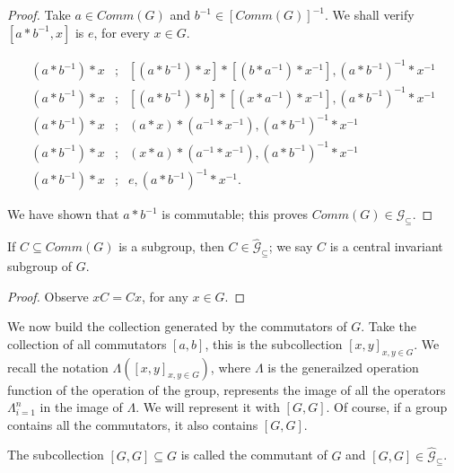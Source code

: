 \documentclass [12pt]{book}
\begin{document}
\begin{proof}Take $a\in Comm(G)$ and $b^{-1}\in[Comm(G)]^{-1}$. We shall verify $[a*b^{-1},x]$ is $e$, for every $x\in G$.

\begin{eqnarray}\nonumber (a*b^{-1})*x&;&[(a*b^{-1})*x]*[(b*a^{-1})*x^{-1}],(a*b^{-1})^{-1}*x^{-1}\\\nonumber (a*b^{-1})*x&;&[(a*b^{-1})*b]*[(x*a^{-1})*x^{-1}],(a*b^{-1})^{-1}*x^{-1}\\\nonumber (a*b^{-1})*x&;&(a*x)*(a^{-1}*x^{-1}),(a*b^{-1})^{-1}*x^{-1}\\\nonumber (a*b^{-1})*x&;&(x*a)*(a^{-1}*x^{-1}),(a*b^{-1})^{-1}*x^{-1}\\\nonumber (a*b^{-1})*x&;&e,(a*b^{-1})^{-1}*x^{-1}.\end{eqnarray}

 We have shown that $a*b^{-1}$ is commutable; this proves $Comm(G)\in\mathcal{G}_{\subseteq}$.\end{proof}

\begin{proposition}If $C\subseteq Comm(G)$ is a subgroup, then $C\in\hat{\mathcal{G}}_{\subseteq}$; we say $C$ is a central invariant subgroup of $G$.\end{proposition}

\begin{proof}Observe $xC=Cx$, for any $x\in G$.\end{proof}

We now build the collection generated by the commutators of $G$. Take the collection of all commutators $[a,b]$, this is the subcollection $[x,y]_{x,y\in G}$. We recall the notation $\Lambda([x,y]_{x,y\in G})$, where $\Lambda$ is the generailzed operation function of the operation of the group, represents the image of all the operators $\Lambda_{i=1}^n$ in the image of $\Lambda$. We will represent it with $[G,G]$. Of course, if a group contains all the commutators, it also contains $[G,G]$.

\begin{proposition}The subcollection $[G,G]\subseteq G$ is called the commutant of $G$ and $[G,G]\in\hat{\mathcal{G}}_{\subseteq}$.\end{proposition}
\end{document}
